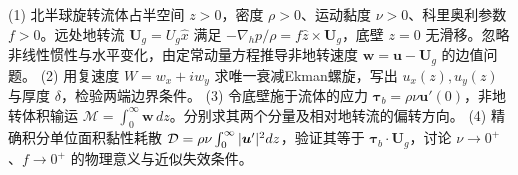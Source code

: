 (1) 北半球旋转流体占半空间 \(z>0\)，密度 \(\rho>0\)、运动黏度 \(\nu>0\)、科里奥利参数 \(f>0\)。远处地转流 \(\boldsymbol U_g=U_g\hat x\) 满足 \(-\nabla_h p/\rho=f\hat z\times\boldsymbol U_g\)，底壁 \(z=0\) 无滑移。忽略非线性惯性与水平变化，由定常动量方程推导非地转速度 \(\boldsymbol w=\boldsymbol u-\boldsymbol U_g\) 的边值问题。
(2) 用复速度 \(W=w_x+iw_y\) 求唯一衰减Ekman螺旋，写出 \(u_x(z),u_y(z)\) 与厚度 \(\delta\)，检验两端边界条件。
(3) 令底壁施于流体的应力 \(\boldsymbol\tau_b=\rho\nu\boldsymbol u'(0)\)，非地转体积输运 \(\boldsymbol{\mathcal M}=\int_0^\infty\boldsymbol w\,dz\)。分别求其两个分量及相对地转流的偏转方向。
(4) 精确积分单位面积黏性耗散 \({\cal D}=\rho\nu\int_0^\infty|\boldsymbol u'|^2dz\)，验证其等于 \(\boldsymbol\tau_b\cdot\boldsymbol U_g\)，讨论 \(\nu\to0^+\)、\(f\to0^+\) 的物理意义与近似失效条件。
